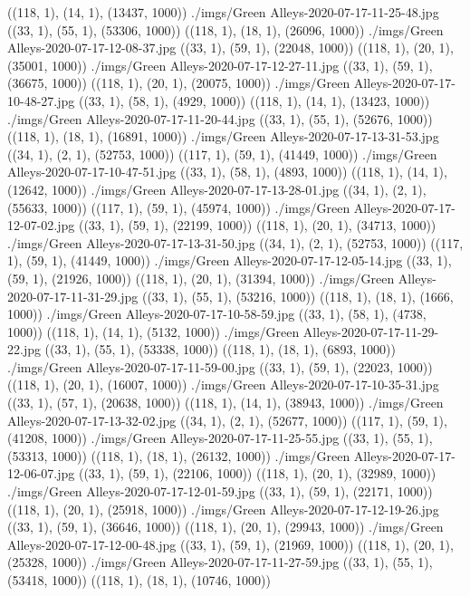 ((118, 1), (14, 1), (13437, 1000))
./imgs/Green Alleys-2020-07-17-11-25-48.jpg
((33, 1), (55, 1), (53306, 1000))
((118, 1), (18, 1), (26096, 1000))
./imgs/Green Alleys-2020-07-17-12-08-37.jpg
((33, 1), (59, 1), (22048, 1000))
((118, 1), (20, 1), (35001, 1000))
./imgs/Green Alleys-2020-07-17-12-27-11.jpg
((33, 1), (59, 1), (36675, 1000))
((118, 1), (20, 1), (20075, 1000))
./imgs/Green Alleys-2020-07-17-10-48-27.jpg
((33, 1), (58, 1), (4929, 1000))
((118, 1), (14, 1), (13423, 1000))
./imgs/Green Alleys-2020-07-17-11-20-44.jpg
((33, 1), (55, 1), (52676, 1000))
((118, 1), (18, 1), (16891, 1000))
./imgs/Green Alleys-2020-07-17-13-31-53.jpg
((34, 1), (2, 1), (52753, 1000))
((117, 1), (59, 1), (41449, 1000))
./imgs/Green Alleys-2020-07-17-10-47-51.jpg
((33, 1), (58, 1), (4893, 1000))
((118, 1), (14, 1), (12642, 1000))
./imgs/Green Alleys-2020-07-17-13-28-01.jpg
((34, 1), (2, 1), (55633, 1000))
((117, 1), (59, 1), (45974, 1000))
./imgs/Green Alleys-2020-07-17-12-07-02.jpg
((33, 1), (59, 1), (22199, 1000))
((118, 1), (20, 1), (34713, 1000))
./imgs/Green Alleys-2020-07-17-13-31-50.jpg
((34, 1), (2, 1), (52753, 1000))
((117, 1), (59, 1), (41449, 1000))
./imgs/Green Alleys-2020-07-17-12-05-14.jpg
((33, 1), (59, 1), (21926, 1000))
((118, 1), (20, 1), (31394, 1000))
./imgs/Green Alleys-2020-07-17-11-31-29.jpg
((33, 1), (55, 1), (53216, 1000))
((118, 1), (18, 1), (1666, 1000))
./imgs/Green Alleys-2020-07-17-10-58-59.jpg
((33, 1), (58, 1), (4738, 1000))
((118, 1), (14, 1), (5132, 1000))
./imgs/Green Alleys-2020-07-17-11-29-22.jpg
((33, 1), (55, 1), (53338, 1000))
((118, 1), (18, 1), (6893, 1000))
./imgs/Green Alleys-2020-07-17-11-59-00.jpg
((33, 1), (59, 1), (22023, 1000))
((118, 1), (20, 1), (16007, 1000))
./imgs/Green Alleys-2020-07-17-10-35-31.jpg
((33, 1), (57, 1), (20638, 1000))
((118, 1), (14, 1), (38943, 1000))
./imgs/Green Alleys-2020-07-17-13-32-02.jpg
((34, 1), (2, 1), (52677, 1000))
((117, 1), (59, 1), (41208, 1000))
./imgs/Green Alleys-2020-07-17-11-25-55.jpg
((33, 1), (55, 1), (53313, 1000))
((118, 1), (18, 1), (26132, 1000))
./imgs/Green Alleys-2020-07-17-12-06-07.jpg
((33, 1), (59, 1), (22106, 1000))
((118, 1), (20, 1), (32989, 1000))
./imgs/Green Alleys-2020-07-17-12-01-59.jpg
((33, 1), (59, 1), (22171, 1000))
((118, 1), (20, 1), (25918, 1000))
./imgs/Green Alleys-2020-07-17-12-19-26.jpg
((33, 1), (59, 1), (36646, 1000))
((118, 1), (20, 1), (29943, 1000))
./imgs/Green Alleys-2020-07-17-12-00-48.jpg
((33, 1), (59, 1), (21969, 1000))
((118, 1), (20, 1), (25328, 1000))
./imgs/Green Alleys-2020-07-17-11-27-59.jpg
((33, 1), (55, 1), (53418, 1000))
((118, 1), (18, 1), (10746, 1000))
